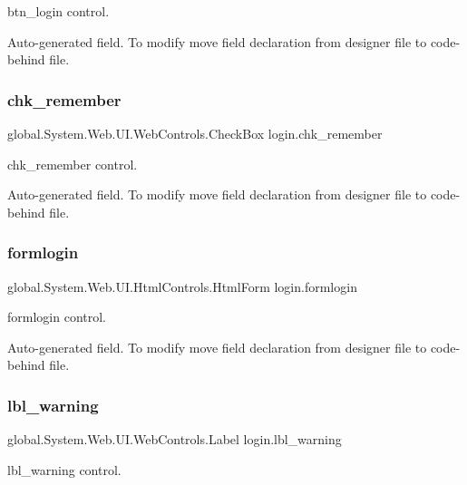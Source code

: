 btn\+\_\+login control. 

Auto-\/generated field. To modify move field declaration from designer file to code-\/behind file. \mbox{\label{classlogin_a954d3486d679c27354627843b38b771e}} 
\subsubsection{\texorpdfstring{chk\_remember}{chk\_remember}}
{\footnotesize\ttfamily global.\+System.\+Web.\+U\+I.\+Web\+Controls.\+Check\+Box login.\+chk\+\_\+remember\hspace{0.3cm}{\ttfamily [protected]}}



chk\+\_\+remember control. 

Auto-\/generated field. To modify move field declaration from designer file to code-\/behind file. \mbox{\label{classlogin_a1d73d7512615559b12aaf3f7cf7c9a22}} 
\subsubsection{\texorpdfstring{formlogin}{formlogin}}
{\footnotesize\ttfamily global.\+System.\+Web.\+U\+I.\+Html\+Controls.\+Html\+Form login.\+formlogin\hspace{0.3cm}{\ttfamily [protected]}}



formlogin control. 

Auto-\/generated field. To modify move field declaration from designer file to code-\/behind file. \mbox{\label{classlogin_a8bb58776f29e9d995622f3217e1e1c92}} 
\subsubsection{\texorpdfstring{lbl\_warning}{lbl\_warning}}
{\footnotesize\ttfamily global.\+System.\+Web.\+U\+I.\+Web\+Controls.\+Label login.\+lbl\+\_\+warning\hspace{0.3cm}{\ttfamily [protected]}}



lbl\+\_\+warning control. 

